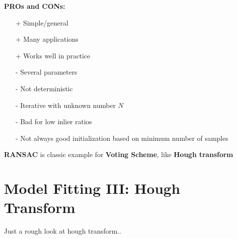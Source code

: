 \textbf{PROs and CONs:}
\begin{itemize}
    \item[+] Simple/general
    \item[+] Many applications 
    \item[+] Works well in practice
    \item[-] Several parameters
    \item[-] Not deterministic
    \item[-] Iterative with unknown number $N$
    \item[-] Bad for low inlier ratios
    \item[-] Not always good initialization based on minimum number of samples
\end{itemize}

\textbf{RANSAC} is classic example for \textbf{Voting Scheme}, like \textbf{Hough transform}

\section{Model Fitting III: Hough Transform}

Just a rough look at hough transform..

